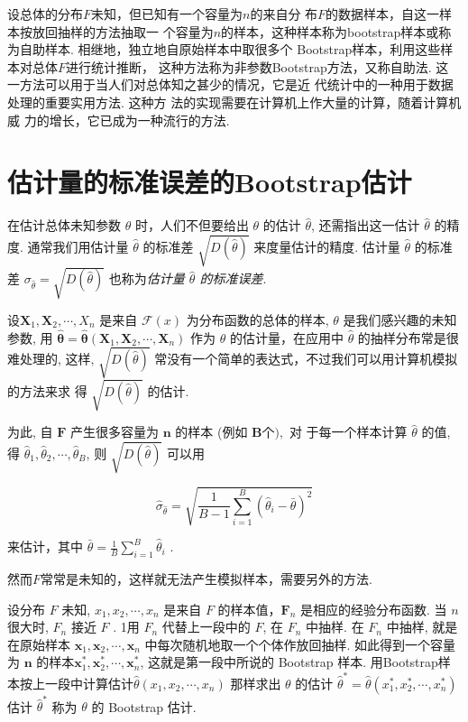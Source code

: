 设总体的分布$F$未知，但已知有一个容量为$n$的来自分
布$F$的数据样本，自这一样本按放回抽样的方法抽取一
个容量为$n$的样本，这种样本称为bootstrap样本或称
为自助样本. 相继地，独立地自原始样本中取很多个
Bootstrap样本，利用这些样本对总体$F$进行统计推断，
这种方法称为非参数Bootstrap方法，又称自助法. 这
一方法可以用于当人们对总体知之甚少的情况，它是近
代统计中的一种用于数据处理的重要实用方法. 这种方
法的实现需要在计算机上作大量的计算，随着计算机威
力的增长，它已成为一种流行的方法. 

\section{估计量的标准误差的Bootstrap估计}

在估计总体未知参数 $ \theta $ 时，人们不但要给出 $ \theta $ 的估计 $ \hat{\theta} $, 还需指出这一估计 $ \hat{\theta} $ 的精度. 通常我们用估计量 $ \hat{\theta} $
的标准差 $ \sqrt{D(\hat{\theta})} $ 来度量估计的精度. 估计量 $ \hat{\theta} $ 的标准差 $ \sigma_{\hat{\theta}}=\sqrt{D(\hat{\theta})} $ 也称为\textit{估计量 $ \hat{\theta} $ 的标准误差}. 

设$ \boldsymbol{X}_{1}, \boldsymbol{X}_{2}, \cdots, X_{n} $ 是来自 $ \mathcal{F}(x) $ 为分布函数的总体的样本, $ \theta $ 是我们感兴趣的未知参数, 用 $ \hat{\boldsymbol{\theta}}=\hat{\boldsymbol{\theta}}\left(\boldsymbol{X}_{1}, \boldsymbol{X}_{2}, \cdots, \boldsymbol{X}_{n}\right) $ 作为 $ \theta $ 的估计量，在应用中 $ \hat{\theta} $ 的抽样分布常是很难处理的, 这样, $ \sqrt{D(\hat{\theta})} $ 常没有一个简单的表达式，不过我们可以用计算机模拟的方法来求 得 $ \sqrt{D(\hat{\theta})} $ 的估计. 

为此, 自 $ \boldsymbol{F} $ 产生很多容量为 $ \boldsymbol{n} $ 的样本 (例如 $ \boldsymbol{B 个 ) ,} $ 对 于每一个样本计算 $ \hat{\theta} $ 的值, 得 $ \hat{\theta}_{1}, \hat{\theta}_{2}, \cdots, \hat{\theta}_{B} $, 则 $ \sqrt{D(\hat{\theta})} $ 可以用

$$ \hat{\sigma}_{\hat{\theta}}=\sqrt{\frac{1}{B-1} \sum_{i=1}^{B}\left(\hat{\theta}_{i}-\bar{\theta}\right)^{2}} $$

来估计，其中 $ \bar{\theta}=\frac{1}{B} \sum_{i=1}^{B} \hat{\theta}_{i} $ . 

然而$F$常常是未知的，这样就无法产生模拟样本，需要另外的方法. 

设分布 $ F $ 未知, $ x_{1}, x_{2}, \cdots, x_{n} $ 是来自 $ F $ 的样本值，$ \boldsymbol{F}_{n} $ 是相应的经验分布函数. 当 $ n $ 很大时, $ F_{n} $ 接近 $ F $ . 1用 $ F_{n} $ 代替上一段中的 $ F $, 在 $ F_{n} $ 中抽样. 在 $ F_{n} $ 中抽样, 就是在原始样本 $ \boldsymbol{x}_{1}, \boldsymbol{x}_{2}, \cdots, \boldsymbol{x}_{n} $ 中每次随机地取一个个体作放回抽样. 如此得到一个容量为 $ \boldsymbol{n} $ 的样本$ \boldsymbol{x}_{1}^{*}, \boldsymbol{x}_{2}^{*}, \cdots, \boldsymbol{x}_{n}^{*} $, 这就是第一段中所说的 Bootstrap 样本. 用Bootstrap样本按上一段中计算估计$ \hat{\theta}\left(x_{1}, x_{2}, \cdots, x_{n}\right) $ 那样求出 $ \theta $ 的估计 $ \hat{\theta}^{*}=\hat{\theta}\left(x_{1}^{*}, x_{2}^{*}, \cdots, x_{n}^{*}\right) $估计 $ \hat{\theta}^{*} $ 称为 $ \theta $ 的 Bootstrap 估计. 



